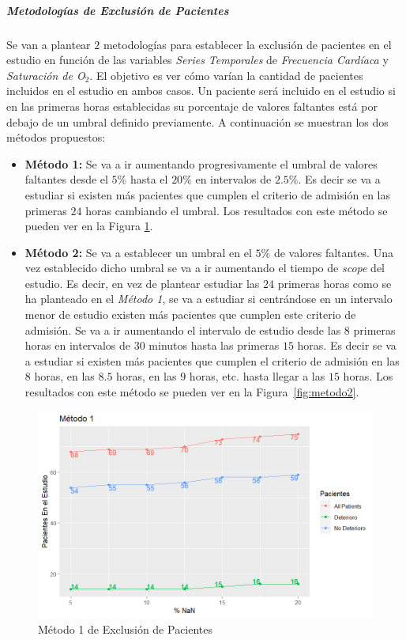 \newpage

\subparagraph{Metodologías de Exclusión de Pacientes}\label{sec:metodologias_exclusion_pacientes}

Se van a plantear $2$ metodologías para establecer la exclusión de pacientes en el estudio en función de las variables \textit{Series Temporales} de \textit{Frecuencia Cardíaca} y \textit{Saturación de O$_2$}. El objetivo es ver cómo varían la cantidad de pacientes incluidos en el estudio en ambos casos. Un paciente será incluido en el estudio si en las primeras horas establecidas su porcentaje de valores faltantes está por debajo de un umbral definido previamente. A continuación se muestran los dos métodos propuestos: 

\begin{itemize}
    \item \textbf{Método 1:} Se va a ir aumentando progresivamente el umbral de valores faltantes desde el $5 \%$ hasta el $20 \%$ en intervalos de $2.5 \%$.  Es decir se va a estudiar si existen más pacientes que cumplen el criterio de admisión en las primeras $24$ horas cambiando el umbral. Los resultados con este método se pueden ver en la Figura \ref{fig:metodo1}.
    \item \textbf{Método 2:} Se va a establecer un umbral en el $5 \%$ de valores faltantes. Una vez establecido dicho umbral se va a ir aumentando el tiempo de \textit{scope} del estudio. Es decir, en vez de plantear estudiar las $24$ primeras horas como se ha planteado en el \textit{Método 1}, se va a estudiar si centrándose en un intervalo menor de estudio existen más pacientes que cumplen este criterio de admisión. Se va a ir aumentando el intervalo de estudio desde las $8$ primeras horas en intervalos de $30$ minutos hasta las primeras $15$ horas. Es decir se va a estudiar si existen más pacientes que cumplen el criterio de admisión en las $8$ horas, en las $8.5$ horas, en las  $9$ horas, etc. hasta llegar a las $15$ horas.  Los resultados con este método se pueden ver en la Figura~\ref{fig:metodo2}.
\end{itemize}

\begin{figure}[H]
    \centering
    \includegraphics[scale = 1]{./img/metodo1.png}
    \caption{Método 1 de Exclusión de Pacientes}
    \label{fig:metodo1}
\end{figure}

